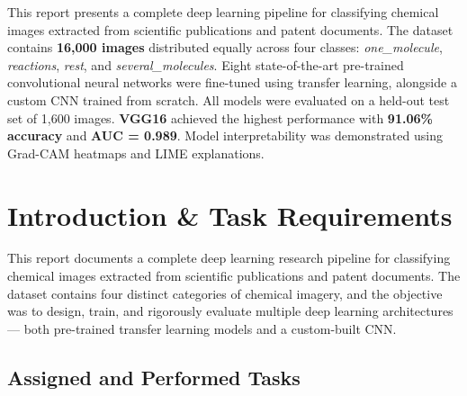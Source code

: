 \documentclass[12pt,a4paper]{article}
\newcommand{\modelname}[1]{\textbf{#1}}
\begin{document}
\newpage
{}
\thispagestyle{plain}
{\sffamily\tableofcontents}
\newpage

\begin{tcolorbox}[
  enhanced,
  colback=NavyBlue!5!white,
  colframe=NavyBlue,
  title={\sffamily\bfseries Abstract},
  fonttitle=\large,
  arc=3pt, boxrule=1pt,
  left=12pt, right=12pt, top=8pt, bottom=8pt
]
This report presents a complete deep learning pipeline for classifying chemical images extracted from scientific publications and patent documents. The dataset contains \textbf{16,000 images} distributed equally across four classes: \textit{one\_molecule}, \textit{reactions}, \textit{rest}, and \textit{several\_molecules}. Eight state-of-the-art pre-trained convolutional neural networks were fine-tuned using transfer learning, alongside a custom CNN trained from scratch. All models were evaluated on a held-out test set of 1,600 images. \modelname{VGG16} achieved the highest performance with \textbf{91.06\% accuracy} and \textbf{AUC = 0.989}. Model interpretability was demonstrated using Grad-CAM heatmaps and LIME explanations.
\end{tcolorbox}
\vspace{1em}


\section{Introduction \& Task Requirements}

This report documents a complete deep learning research pipeline for classifying chemical images extracted from scientific publications and patent documents. The dataset contains four distinct categories of chemical imagery, and the objective was to design, train, and rigorously evaluate multiple deep learning architectures --- both pre-trained transfer learning models and a custom-built CNN.

\subsection{Assigned and Performed Tasks}
\end{document}
